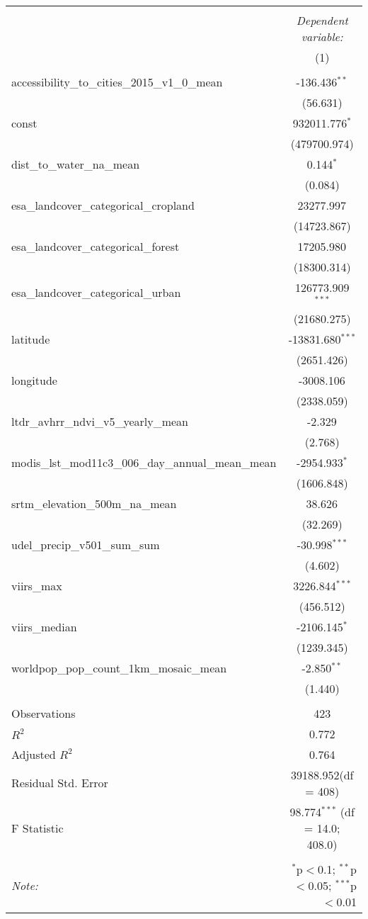 \begin{table}[!htbp] \centering
\begin{tabular}{@{\extracolsep{5pt}}lc}
\\[-1.8ex]\hline
\hline \\[-1.8ex]
& \multicolumn{1}{c}{\textit{Dependent variable:}} \
\cr \cline{1-2}
\\[-1.8ex] & (1) \\
\hline \\[-1.8ex]
 accessibility_to_cities_2015_v1_0_mean & -136.436$^{**}$ \\
  & (56.631) \\
 const & 932011.776$^{*}$ \\
  & (479700.974) \\
 dist_to_water_na_mean & 0.144$^{*}$ \\
  & (0.084) \\
 esa_landcover_categorical_cropland & 23277.997$^{}$ \\
  & (14723.867) \\
 esa_landcover_categorical_forest & 17205.980$^{}$ \\
  & (18300.314) \\
 esa_landcover_categorical_urban & 126773.909$^{***}$ \\
  & (21680.275) \\
 latitude & -13831.680$^{***}$ \\
  & (2651.426) \\
 longitude & -3008.106$^{}$ \\
  & (2338.059) \\
 ltdr_avhrr_ndvi_v5_yearly_mean & -2.329$^{}$ \\
  & (2.768) \\
 modis_lst_mod11c3_006_day_annual_mean_mean & -2954.933$^{*}$ \\
  & (1606.848) \\
 srtm_elevation_500m_na_mean & 38.626$^{}$ \\
  & (32.269) \\
 udel_precip_v501_sum_sum & -30.998$^{***}$ \\
  & (4.602) \\
 viirs_max & 3226.844$^{***}$ \\
  & (456.512) \\
 viirs_median & -2106.145$^{*}$ \\
  & (1239.345) \\
 worldpop_pop_count_1km_mosaic_mean & -2.850$^{**}$ \\
  & (1.440) \\
\hline \\[-1.8ex]
 Observations & 423 \\
 $R^2$ & 0.772 \\
 Adjusted $R^2$ & 0.764 \\
 Residual Std. Error & 39188.952(df = 408)  \\
 F Statistic & 98.774$^{***}$ (df = 14.0; 408.0) \\
\hline
\hline \\[-1.8ex]
\textit{Note:} & \multicolumn{1}{r}{$^{*}$p$<$0.1; $^{**}$p$<$0.05; $^{***}$p$<$0.01} \\
\end{tabular}
\end{table}